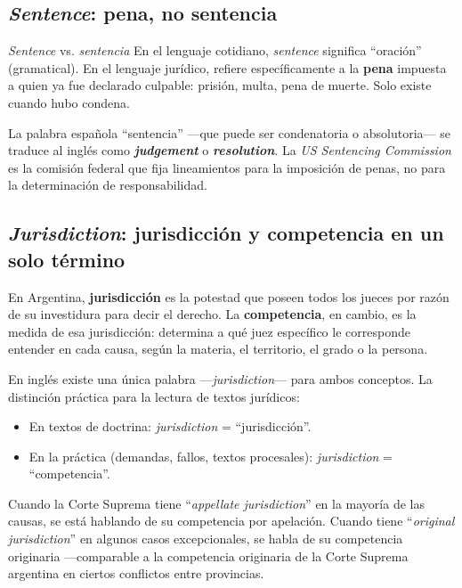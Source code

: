 \documentclass[12pt,oneside]{book}
\begin{document}
\subsection{\textit{Sentence}: pena, no sentencia}

\begin{definition}{\textit{Sentence} vs. \textit{sentencia}}
En el lenguaje cotidiano, \textit{sentence} significa ``oración'' (gramatical). En el lenguaje jurídico, refiere específicamente a la \textbf{pena} impuesta a quien ya fue declarado culpable: prisión, multa, pena de muerte. Solo existe cuando hubo condena.

La palabra española ``sentencia'' ---que puede ser condenatoria o absolutoria--- se traduce al inglés como \textbf{\textit{judgement}} o \textbf{\textit{resolution}}. La \textit{US Sentencing Commission} es la comisión federal que fija lineamientos para la imposición de penas, no para la determinación de responsabilidad.
\end{definition}

\subsection{\textit{Jurisdiction}: jurisdicción y competencia en un solo término}

En Argentina, \textbf{jurisdicción} es la potestad que poseen todos los jueces por razón de su investidura para decir el derecho. La \textbf{competencia}, en cambio, es la medida de esa jurisdicción: determina a qué juez específico le corresponde entender en cada causa, según la materia, el territorio, el grado o la persona.

En inglés existe una única palabra ---\textit{jurisdiction}--- para ambos conceptos. La distinción práctica para la lectura de textos jurídicos:

\begin{itemize}
    \item En textos de doctrina: \textit{jurisdiction} = ``jurisdicción''.
    \item En la práctica (demandas, fallos, textos procesales): \textit{jurisdiction} = ``competencia''.
\end{itemize}

Cuando la Corte Suprema tiene ``\textit{appellate jurisdiction}'' en la mayoría de las causas, se está hablando de su competencia por apelación. Cuando tiene ``\textit{original jurisdiction}'' en algunos casos excepcionales, se habla de su competencia originaria ---comparable a la competencia originaria de la Corte Suprema argentina en ciertos conflictos entre provincias.
\end{document}
